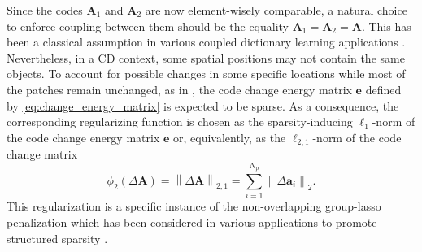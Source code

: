 \documentclass[review]{elsarticle}
\newcommand{\Npatch}{N_{\mathrm{p}}}
\begin{document}
Since the codes $\mathbf{A}_{1}$ and $\mathbf{A}_{2}$ are now element-wisely comparable, a natural choice to enforce coupling between them should be the equality $\mathbf{A}_{1} = \mathbf{A}_{2} = \mathbf{A}$. This has been a classical assumption in various coupled dictionary learning applications \citep{yang_image_2010,zeyde_single_2010,yang_coupled_2012}. Nevertheless, in a CD context, some spatial positions may not contain the same objects. To account for possible changes in some specific locations while most of the patches remain unchanged, as in \citet{ferraris_robust_2017},  the code change energy matrix $\mathbf{e}$ defined by \eqref{eq:change_energy_matrix} is expected to be sparse. As a consequence, the corresponding regularizing function is chosen as the sparsity-inducing
$\ell_1$-norm of the code change energy matrix $\mathbf{e}$ or, equivalently, as the $\ell_{2,1}$-norm of the code change matrix
%
\begin{equation}
	\label{eq:phi_2}
	\phi_{2}\left(\Delta\mathbf{A}\right) = \left\|\Delta\mathbf{A}\right\|_{2,1} = \sum_{i=1}^{\Npatch} \left\|\Delta \mathbf{a}_i\right\|_2.
\end{equation}
%
This regularization is a specific instance of the non-overlapping group-lasso penalization \citep{bach_optimization_2011} which has been considered in various applications to promote structured sparsity \citep{wright_sparse_2009,fevotte_nonlinear_2015,ferraris_robust_2017}.
\end{document}
